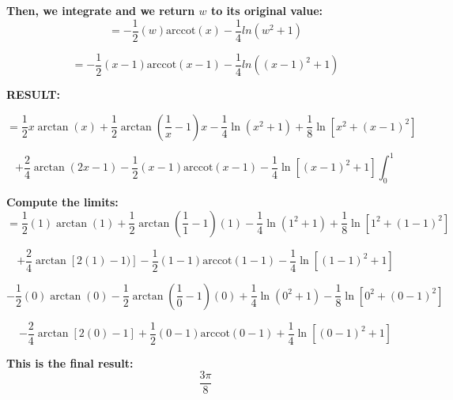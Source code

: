 \documentclass{article}
\begin{document}
\bigskip\textbf{Then, we integrate and we return $w$ to its original value:}
\begin{equation*}
   =-\frac{1}{2}(w)\textrm{arccot}(x)-\frac{1}{4}ln(w^2+1)
\end{equation*}

\begin{equation*}
   =-\frac{1}{2}(x-1)\textrm{arccot}(x-1)-\frac{1}{4}ln((x-1)^2+1)
\end{equation*}

\bigskip \textbf{RESULT:}

\begin{equation*}
    =\frac{1}{2} x \arctan(x) +\frac{1}{2} \arctan(\frac{1}{x}-1) x -\frac{1}{4} \ln{(x^2 +1)} +\frac{1}{8} \ln{[x^2 +(x-1)^2]}
\end{equation*}

\begin{equation*}
        +\frac{2}{4}\arctan(2x-1) -\frac{1}{2}(x-1) \text{arccot} (x-1) -\frac{1}{4}\ln{[(x-1)^2 +1]} \int_0^1
\end{equation*}

\bigskip\textbf{Compute the limits:}
\begin{equation*}
    =\frac{1}{2} (1) \arctan(1) +\frac{1}{2} \arctan(\frac{1}{1}-1) (1) -\frac{1}{4} \ln{(1^2 +1)} +\frac{1}{8} \ln{[1^2 +(1-1)^2]}
\end{equation*}

\begin{equation*}
        +\frac{2}{4}\arctan[2(1)-1)] -\frac{1}{2}(1-1) \text{arccot} (1-1) -\frac{1}{4}\ln{[(1-1)^2 +1]} 
\end{equation*}

\begin{equation*}
    -\frac{1}{2} (0) \arctan(0) -\frac{1}{2} \arctan(\frac{1}{0}-1) (0) +\frac{1}{4} \ln{(0^2 +1)} -\frac{1}{8} \ln{[0^2 +(0-1)^2]}
\end{equation*}

\begin{equation*}
        -\frac{2}{4}\arctan[2(0)-1] +\frac{1}{2}(0-1) \text{arccot} (0-1) +\frac{1}{4}\ln{[(0-1)^2 +1]}
\end{equation*}

\bigskip\textbf{This is the final result:}
\begin{equation*}
    \frac{3\pi}{8} 
\end{equation*}
\end{document}
